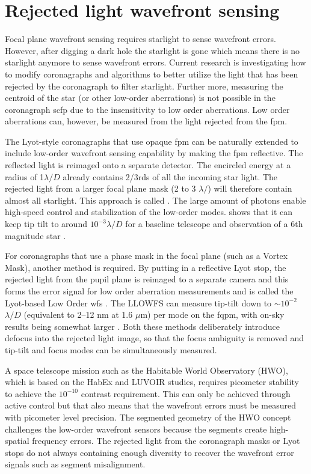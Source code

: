 \documentclass[letterpaper]{ar-1col}
\newcommand{\mum}{$\mu$m}
\newcommand{\ld}{$\lambda/D$}
\begin{document}
\section{Rejected light wavefront sensing} 
Focal plane wavefront sensing requires starlight to sense wavefront errors. However, after digging a dark hole the starlight is gone which means there is no starlight anymore to sense wavefront errors. Current research is investigating how to modify coronagraphs and algorithms to better utilize the light that has been rejected by the coronagraph to filter starlight. Further more, measuring the centroid of the star (or other low-order aberrations) is not possible in the coronagraph \ac{scfp} due to the insensitivity to low order aberrations. Low order aberrations can, however, be measured from the light rejected from the \ac{fpm}.

The Lyot-style coronagraphs that use opaque \ac{fpm} can be naturally extended to include low-order wavefront sensing capability by making the \ac{fpm} reflective. The reflected light is reimaged onto a separate detector. The encircled energy at a radius of 1$\lambda/D$ already contains 2/3rds of all the incoming star light. The rejected light from a larger focal plane mask (2 to 3 $\lambda/$) will therefore contain almost all starlight. This approach is called \citep[Coronagraphic low order \ac{wfs}; CLOWFS - ][]{Guyon09}. The large amount of photons enable high-speed control and stabilization of the low-order modes. shows that it can keep tip tilt to around $10^{-3}$\ld{} for a baseline telescope and observation of a 6th magnitude star \citep{Guyon09}.


For coronagraphs that use a phase mask in the focal plane (such as a Vortex Mask), another method is required. By putting in a reflective Lyot stop, the rejected light from the pupil plane is reimaged to a separate camera and this forms the error signal for low order aberration measurements and is called the Lyot-based Low Order \ac{wfs} \citep[LLOWFS; ][]{Singh14,Singh15}.
%
The LLOWFS can measure tip-tilt down to $\sim 10^{-2}$\ld{} (equivalent to 2–12 nm at 1.6 \mum{}) per mode on the \ac{fqpm}, with on-sky results being somewhat larger \citep{Singh15}.
%
Both these methods deliberately introduce defocus into the rejected light image, so that the focus ambiguity is removed and tip-tilt and focus modes can be simultaneously measured.

%
A space telescope mission such as the Habitable World Observatory (HWO), which is based on the HabEx and LUVOIR studies, requires picometer stability to achieve the $10^{-10}$ contrast requirement. This can only be achieved through active control but that also means that the wavefront errors must be measured with picometer level precision. The segmented geometry of the HWO concept challenges the low-order wavefront sensors because the segments create high-spatial frequency errors. The rejected light from the coronagraph masks or Lyot stops do not always containing enough diversity to recover the wavefront error signals such as segment misalignment.
\end{document}
